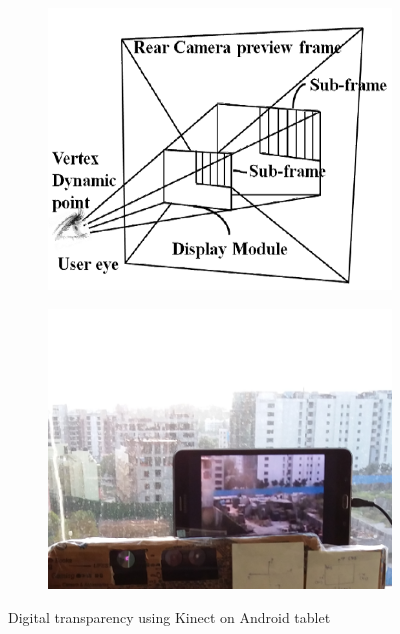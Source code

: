 \documentclass[12pt,twocolumn,letterpaper]{article}
\begin{document}
\begin{figure}
\begin{subfigure}{0.22\textwidth}
\includegraphics[scale=0.3]{images/transparenttablet}
\end{subfigure}
\begin{subfigure}{0.22\textwidth}
\includegraphics[scale=0.4]{images/transparenttablet1}
\end{subfigure}
\caption{Digital transparency using Kinect on Android tablet}
\label{fig:digitaltransparency}
\end{figure}

     
\end{document}
